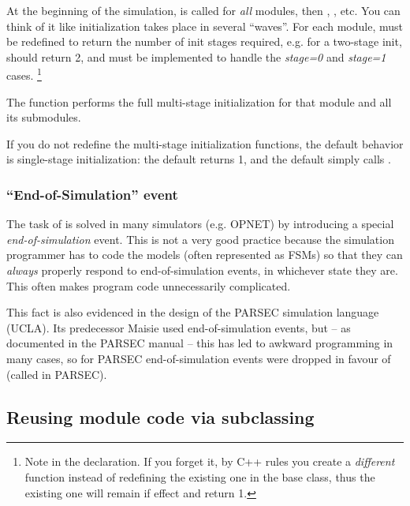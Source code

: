 At the beginning of the simulation, 
is called for \textit{all} modules, then ,
, etc. You can think of it like
initialization takes place in several ``waves''. For each module,
 must be redefined to return the number of init
stages required, e.g. for a two-stage init, 
should return 2, and  must be implemented to
handle the \textit{stage=0} and \textit{stage=1} cases.
  \footnote{Note  in the  declaration.
  If you forget it, by C++ rules you create a \textit{different} function
  instead of redefining the existing one in the base class, thus the
  existing one will remain if effect and return 1.}

The  function performs the full multi-stage initialization
for that module and all its submodules.

If you do not redefine the multi-stage initialization functions, the
default behavior is single-stage initialization: the default
 returns 1, and the default  simply calls .


\subsubsection{``End-of-Simulation'' event}


The task of  is solved in many simulators (e.g. OPNET)
by introducing a special
\textit{end-of-simulation} event. This is not
a very good practice because the simulation programmer has to code the
models (often represented as FSMs) so that they can \textit{always} properly
respond to end-of-simulation events, in whichever state they are. This
often makes program code unnecessarily complicated.

This fact is also evidenced in the design of the PARSEC
simulation language (UCLA). Its predecessor Maisie used
end-of-simulation events, but -- as documented in the PARSEC manual --
this has led to awkward programming in many cases, so for PARSEC
end-of-simulation events were dropped in favour of 
(called  in PARSEC).



\subsection{Reusing module code via subclassing}

